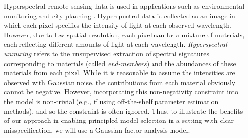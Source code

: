 Hyperspectral remote sensing data is used in applications such as environmental monitoring and city planning \citep{Brook_Dust_over_Green_Canopy_2016,Ji_Estimatng_Vegetation_Fractional_Cover_2016,Lin_RetrievingHydrousMinerals_2017}.
Hyperspectral data is collected as an image in which each pixel specifies the intensity of light at each observed wavelength.
However, due to low spatial resolution, each pixel can be a mixture of materials,
each reflecting different amounts of light at each wavelength.
\emph{Hyperspectral unmixing} refers to the unsupervised extraction of spectral signatures corresponding to materials (called \emph{end-members}) and the abundances of these materials from each pixel.
While it is reasonable to assume the intensities are observed with Gaussian noise, the contributions from each material obviously cannot be negative.
However, incorporating this non-negativity constraint into the model is non-trivial (e.g., if using off-the-shelf parameter estimation methods),
and so the constraint is often ignored.
Thus, to illustrate the benefits of our approach in enabling principled model selection
in a setting with clear misspecification,
we will use a Gaussian factor analysis model.

